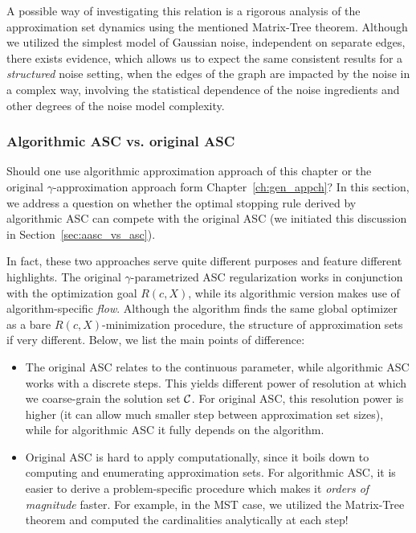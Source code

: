 A possible way of investigating this relation is a rigorous analysis of the
approximation set dynamics using the mentioned Matrix-Tree theorem.
Although we utilized the simplest model of Gaussian noise,
independent on separate edges, there exists evidence, which
allows us to expect the same consistent results for a \emph{structured}
noise setting, when the edges of the graph are impacted by the noise
in a complex way, involving the statistical dependence of the noise
ingredients and other degrees of the noise model complexity.

\subsubsection{Algorithmic ASC vs. original ASC}

Should one use algorithmic approximation approach of this chapter or the
original $\gamma$-approximation approach form Chapter~\ref{ch:gen_appch}? In
this section, we address a question on whether the optimal stopping rule derived
by algorithmic ASC can compete with the original ASC (we initiated this discussion
in Section~\ref{sec:aasc_vs_asc}).

In fact, these two approaches serve quite different purposes and feature
different highlights. The original $\gamma$-parametrized ASC regularization
works in conjunction with the optimization goal $R(c, X)$, while its algorithmic
version makes use of algorithm-specific \textit{flow}. Although the algorithm
finds the same global optimizer as a bare $R(c, X)$-minimization procedure, the
structure of approximation sets if very different. Below, we list the main
points of difference:
\begin{itemize}
\item The original ASC relates to the continuous parameter, while algorithmic ASC
works with a discrete steps. This yields different power of resolution at which 
we coarse-grain the solution set ${\cal C}$. For original ASC, this resolution power 
is higher (it can allow much smaller step between approximation set sizes), while 
for algorithmic ASC it fully depends on the algorithm.

\item Original ASC is hard to apply computationally, since it boils down to 
computing and enumerating approximation sets. For algorithmic ASC, it is easier
to derive a problem-specific procedure which makes it \textit{orders of
magnitude} faster. For example, in the MST case, we utilized the Matrix-Tree
theorem and computed the cardinalities analytically at each step!
\end{itemize}

